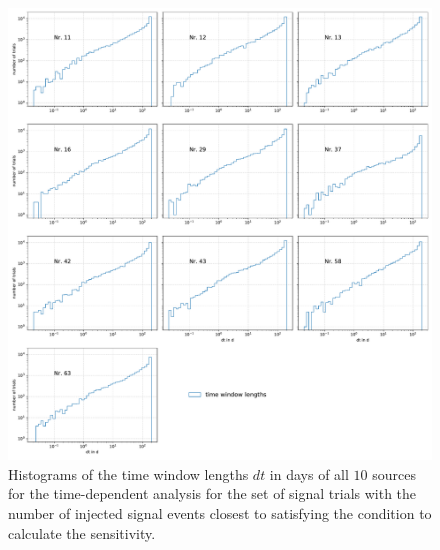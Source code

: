 \begin{figure}
    \centering
    \includegraphics[width=\linewidth]{Plots/appendix/9_years_gfu_gold_time_dep_sens_dt.pdf}
    \caption{Histograms of the time window lengths $dt$ in days of all $\num{10}$ sources for the time-dependent analysis for the set of signal trials with the number of injected signal events closest to satisfying the condition to calculate the sensitivity.}
    \label{fig:sens_dt_all}
\end{figure}

